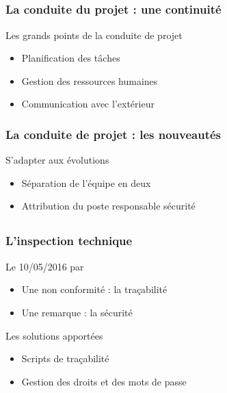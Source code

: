 \speaker{\Sergi{}}
\subsection{} %

\begin{frame}
\frametitle{La conduite du projet : une continuité}
\begin{block}{Les grands points de la conduite de projet}
\begin{itemize}
	\item Planification des tâches
	\item Gestion des ressources humaines
	\item Communication avec l'extérieur
\end{itemize}
\end{block}
\end{frame}

\begin{frame}
\frametitle{La conduite de projet : les nouveautés}
\begin{block}{S'adapter aux évolutions}
\begin{itemize}
	\item Séparation de l'équipe en deux
	\item Attribution du poste responsable sécurité
\end{itemize}
\end{block}

\end{frame}

\subsection{}
\begin{frame}
\frametitle{L'inspection technique}
\begin{block}{Le 10/05/2016 par \nomTuteurPedago{}}
\begin{itemize}
	\item Une non conformité : la traçabilité
	\item Une remarque : la sécurité
\end{itemize}
\end{block}
\begin{block}{Les solutions apportées}
\begin{itemize}
	\item Scripts de traçabilité
	\item Gestion des droits et des mots de passe
\end{itemize}
\end{block}
\end{frame}

